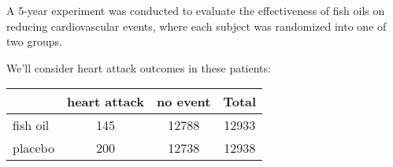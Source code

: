 \documentclass{beamer}
\begin{document}
\begin{frame}
  \begin{example}
    A 5-year experiment was conducted to evaluate the effectiveness of fish oils on reducing cardiovascular events, where each subject was randomized into one of two groups.\pause

    \vspace{1mm}
    We'll consider heart attack outcomes in these patients:
    \begin{center}
      \begin{tabular}{lccc}\hline
        & heart attack & no event & Total \\\hline
        fish oil & 145 & 12788 & 12933 \\
        placebo & 200 & 12738 & 12938 \\\hline
      \end{tabular}
    \end{center}
  \end{example}
\end{frame}

\begin{frame}
  \begin{example}

  \end{example}
  \addtocounter{theorem}{-1}
  \begin{example}[Continued]

  \end{example}
  \begin{example}

  \end{example}
  \begin{examplecont}

  \end{examplecont}
\end{frame}
\end{document}
